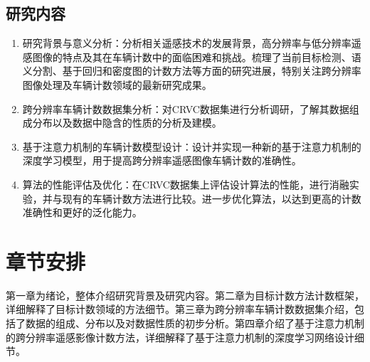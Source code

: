 \subsection{研究内容}
\begin{enumerate}
    \item 研究背景与意义分析：分析相关遥感技术的发展背景，高分辨率与低分辨率遥感图像的特点及其在车辆计数中的面临困难和挑战。梳理了当前目标检测、语义分割、基于回归和密度图的计数方法等方面的研究进展，特别关注跨分辨率图像处理及车辆计数领域的最新研究成果。
    \item 跨分辨率车辆计数数据集分析：对CRVC数据集进行分析调研，了解其数据组成分布以及数据中隐含的性质的分析及建模。
    \item 基于注意力机制的车辆计数模型设计：设计并实现一种新的基于注意力机制的深度学习模型，用于提高跨分辨率遥感图像车辆计数的准确性。
    \item 算法的性能评估及优化：在CRVC数据集上评估设计算法的性能，进行消融实验，并与现有的车辆计数方法进行比较。进一步优化算法，以达到更高的计数准确性和更好的泛化能力。
\end{enumerate}

\section{章节安排}
第一章为绪论，整体介绍研究背景及研究内容。第二章为目标计数方法计数框架，详细解释了目标计数领域的方法细节。第三章为跨分辨率车辆计数数据集介绍，包括了数据的组成、分布以及对数据性质的初步分析。第四章介绍了基于注意力机制的跨分辨率遥感影像计数方法，详细解释了基于注意力机制的深度学习网络设计细节。
